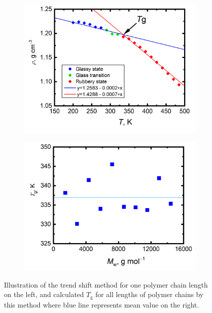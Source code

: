 \begin{figure}[htb!]
	\begin{subfigure}{0.5\textwidth}
		\includegraphics[width=1.0\linewidth]{img/vypocet_tg.png} 
	\end{subfigure}
	\begin{subfigure}{0.5\textwidth}
		\includegraphics[width=1.0\linewidth]{img/glass_temp.png} 
	\end{subfigure}   	
	\caption{Illustration of the trend shift method for one polymer chain length on the left, and calculated $T_\mathrm{g}$ for all lengths of polymer chains by this method where blue line represents mean value on the right.}
	\label{fig:glass}
\end{figure}

